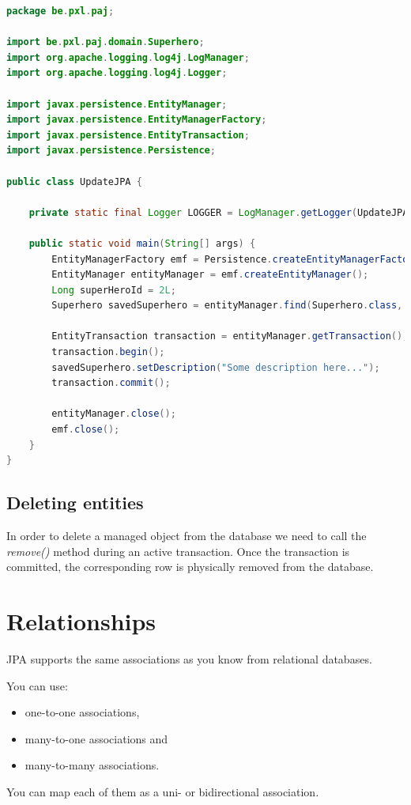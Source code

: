 \begin{lstlisting}[frame=single,language=java]
package be.pxl.paj;

import be.pxl.paj.domain.Superhero;
import org.apache.logging.log4j.LogManager;
import org.apache.logging.log4j.Logger;

import javax.persistence.EntityManager;
import javax.persistence.EntityManagerFactory;
import javax.persistence.EntityTransaction;
import javax.persistence.Persistence;

public class UpdateJPA {

	private static final Logger LOGGER = LogManager.getLogger(UpdateJPA.class);

	public static void main(String[] args) {
		EntityManagerFactory emf = Persistence.createEntityManagerFactory("musicdb_pu");
		EntityManager entityManager = emf.createEntityManager();
		Long superHeroId = 2L;
		Superhero savedSuperhero = entityManager.find(Superhero.class, superHeroId);

		EntityTransaction transaction = entityManager.getTransaction();
		transaction.begin();
		savedSuperhero.setDescription("Some description here...");
		transaction.commit();

		entityManager.close();
		emf.close();
	}
}
\end{lstlisting}

\subsection{Deleting entities}

In order to delete a managed object from the database we need to call the \textit{remove()} method during an active transaction. Once the transaction is committed, the corresponding row is physically removed from the database.


\section{Relationships}

JPA supports the same associations as you know from relational databases.

 You can use:
\begin{itemize}
\item one-to-one associations,
\item many-to-one associations and
\item many-to-many associations.
\end{itemize}
You can map each of them as a uni- or bidirectional association.


